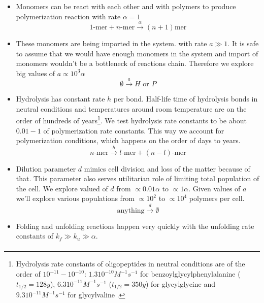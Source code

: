 \documentclass[journal=jacsat,manuscript=article,layout=twocolumn]{achemso}
\newcommand*{\ga}{\alpha}
\begin{document}
\begin{itemize}
 \item Monomers can be react with each other and with polymers to produce polymerization reaction 
with rate 
$\ga = 1$
\begin{equation}
 1\mbox{-mer}+n\mbox{-mer} \xrightarrow{\ga} (n+1)\mbox{mer}
\end{equation}
\item These monomers are being imported in the system. with rate $a\gg1$. It is safe to assume 
that 
we would have enough monomers in the system and import of monomers wouldn't be a bottleneck of 
reactions chain. Therefore we explore big values of $a\propto 10^3\ga$
\begin{equation}
 \emptyset \xrightarrow{a} H\,\,\mbox{or}\,\,P
\end{equation}
\item Hydrolysis has constant rate $h$ per bond. Half-life time of hydrolysis bonds in neutral 
conditions and temperatures around room temperature are on the order of hundreds of 
years\footnote{Hydrolysis rate constants of oligopeptides in 
neutral conditions are of the order of $10^{-11}-10^{-10}$: $1.3  10^{-10} M^{-1}s^{-1} $ 
for benzoylglycylphenylalanine ($t_{1/2} = 128 y$)\cite{Bryant1996}, $6.3  10^{-11} M^{-1} s^{-1}$
($t_{1/2}=350 y$) for glycylglycine and $9.3 10^{-11}M^{-1} s^{-1}$ for glycylvaline
\cite{Smith1998}.}. We test hydrolysis rate constants to be about $0.01-1$ of polymerization rate 
constants. This way we account for polymerization conditions, which happens on the order of days 
to years.
\begin{equation}
 n\mbox{-mer} \xrightarrow{h} l\mbox{-mer}+(n-l)\mbox{-mer}
\end{equation}
\item Dilution parameter $d$ mimics cell division and loss of the matter because of that. 
This parameter also serves utilitarian role of limiting total population of the cell. We explore 
valued of $d$ from $\propto 0.01\ga$ to $\propto 1\ga$. Given values of $a$ we'll explore various 
populations from $\propto 10^2$ to $\propto 10^4$ polymers per 
cell.
\begin{equation}
 \mbox{anything} \xrightarrow{d}\emptyset
\end{equation}
\item Folding and unfolding reactions happen very quickly with 
the unfolding rate constants of $k_f\gg k_{u}\gg\ga$. 
\begin{equation}
\begin{split}

\end{split}
\end{equation}
\end{itemize}
\end{document}
